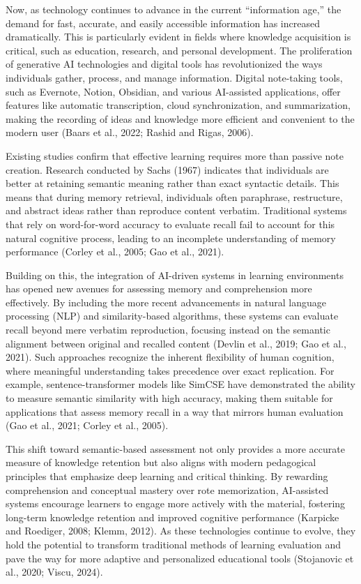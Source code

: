 Now, as technology continues to advance in the current “information age,” the demand for fast, accurate, and easily accessible information has increased dramatically. This is particularly evident in fields where knowledge acquisition is critical, such as education, research, and personal development. The proliferation of generative AI technologies and digital tools has revolutionized the ways individuals gather, process, and manage information. Digital note-taking tools, such as Evernote, Notion, Obsidian, and various AI-assisted applications, offer features like automatic transcription, cloud synchronization, and summarization, making the recording of ideas and knowledge more efficient and convenient to the modern user (Baars et al., 2022; Rashid and Rigas, 2006).

Existing studies confirm that effective learning requires more than passive note creation. Research conducted by Sachs (1967) indicates that individuals are better at retaining semantic meaning rather than exact syntactic details. This means that during memory retrieval, individuals often paraphrase, restructure, and abstract ideas rather than reproduce content verbatim. Traditional systems that rely on word-for-word accuracy to evaluate recall fail to account for this natural cognitive process, leading to an incomplete understanding of memory performance (Corley et al., 2005; Gao et al., 2021).

Building on this, the integration of AI-driven systems in learning environments has opened new avenues for assessing memory and comprehension more effectively. By including the more recent advancements in natural language processing (NLP) and similarity-based algorithms, these systems can evaluate recall beyond mere verbatim reproduction, focusing instead on the semantic alignment between original and recalled content (Devlin et al., 2019; Gao et al., 2021). Such approaches recognize the inherent flexibility of human cognition, where meaningful understanding takes precedence over exact replication. For example, sentence-transformer models like SimCSE have demonstrated the ability to measure semantic similarity with high accuracy, making them suitable for applications that assess memory recall in a way that mirrors human evaluation (Gao et al., 2021; Corley et al., 2005).

This shift toward semantic-based assessment not only provides a more accurate measure of knowledge retention but also aligns with modern pedagogical principles that emphasize deep learning and critical thinking. By rewarding comprehension and conceptual mastery over rote memorization, AI-assisted systems encourage learners to engage more actively with the material, fostering long-term knowledge retention and improved cognitive performance (Karpicke and Roediger, 2008; Klemm, 2012). As these technologies continue to evolve, they hold the potential to transform traditional methods of learning evaluation and pave the way for more adaptive and personalized educational tools (Stojanovic et al., 2020; Viscu, 2024).

